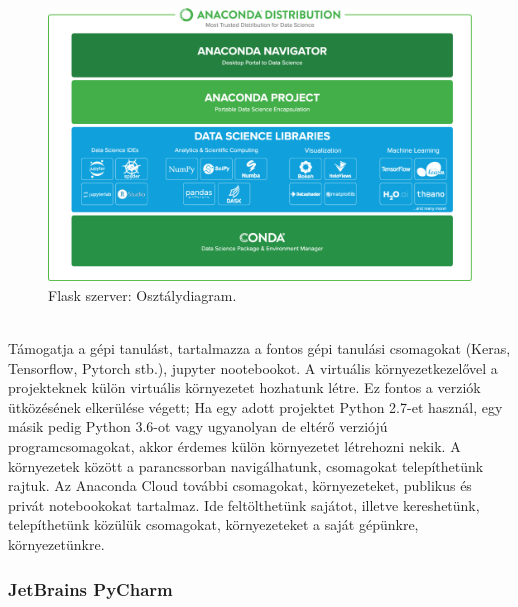 \begin{figure}[!ht]
	\centering
	\includegraphics[width=150mm, keepaspectratio]{figures/anaconda-overview.png}
	\caption{Flask szerver: Osztálydiagram.}
	\label{fig:anaconda-overview}
\end{figure}
\ \\
Támogatja a gépi tanulást, tartalmazza a fontos gépi tanulási csomagokat (Keras, Tensorflow, Pytorch stb.), jupyter nootebookot. A virtuális környezetkezelővel a projekteknek külön virtuális környezetet hozhatunk létre. Ez fontos a verziók ütközésének elkerülése végett; Ha egy adott projektet Python 2.7-et használ, egy másik pedig Python 3.6-ot vagy ugyanolyan de eltérő verziójú programcsomagokat, akkor érdemes külön környezetet létrehozni nekik. A környezetek között a parancssorban navigálhatunk, csomagokat telepíthetünk rajtuk.
\newline
\newline
Az Anaconda Cloud további csomagokat, környezeteket, publikus és privát notebookokat tartalmaz. Ide feltölthetünk sajátot, illetve kereshetünk, telepíthetünk közülük csomagokat, környezeteket a saját gépünkre, környezetünkre.

\subsubsection{JetBrains PyCharm}

